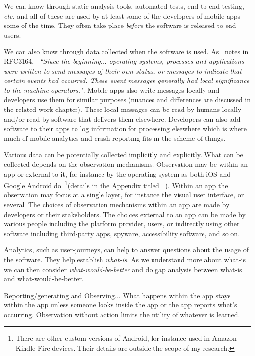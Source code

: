 We can know through static analysis tools, automated tests, end-to-end testing, \emph{etc.} and all of these are used by at least some of the developers of mobile apps some of the time. They often take place \textit{before} the software is released to end users.

We can also know through data collected when the software is used. As~\cite{RFC3164} notes in RFC3164, ~\emph{``Since the beginning... operating systems, processes and applications were written to send messages of their own status, or messages to indicate that certain events had occurred. These event messages generally had local significance to the machine operators."}. Mobile apps also write messages locally and developers use them for similar purposes (nuances and differences are discussed in the related work chapter). These local messages can be read by humans locally and/or read by software that delivers them elsewhere. Developers can also add software to their apps to log information for processing elsewhere which is where much of mobile analytics and crash reporting fits in the scheme of things.

Various data can be potentially collected implicitly and explicitly. What can be collected depends on the observation mechanisms. Observation may be within an app or external to it, for instance by the operating system as both iOS  and Google Android do~\footnote{There are other custom versions of Android, for instance used in Amazon Kindle Fire devices. Their details are outside the scope of my research.}(details in the Appendix titled~\href{chapter-on-mobile-analytics}{\emph{}} ). Within an app the observation may focus at a single layer, for instance the visual user interface, or several. The choices of observation mechanisms within an app are made by developers or their stakeholders. The choices external to an app can be made by various people including the platform provider, users, or indirectly using other software including third-party apps, spyware, accessibility software, and so on.

Analytics, such as user-journeys, can help to answer questions about the usage of the software. They help establish \emph{what-is}. As we understand more about what-is we can then consider \emph{what-would-be-better} and do gap analysis between what-is and what-would-be-better.

Reporting/generating and Observing... What happens within the app stays within the app unless someone looks inside the app or the app reports what's occurring. Observation without action limits the utility of whatever is learned. 

